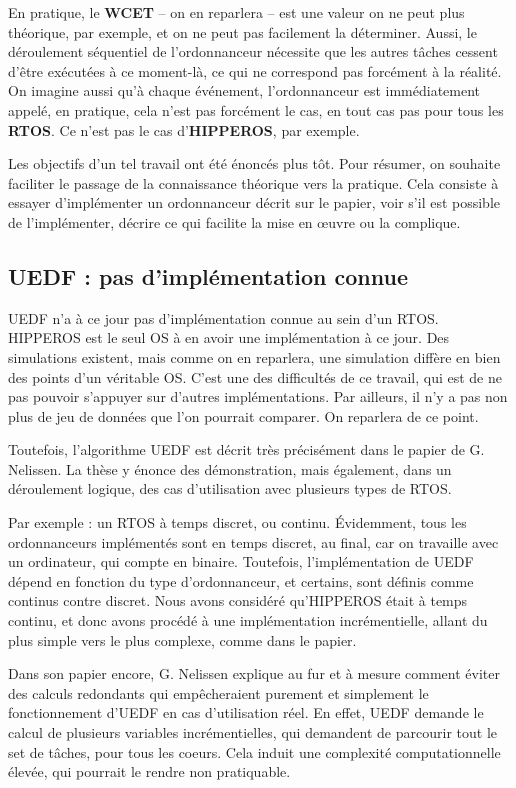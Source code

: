 	En pratique, le \textbf{WCET} -- on en reparlera -- est une valeur on ne peut plus théorique, par exemple, 
	et on ne peut pas facilement la déterminer. 
	Aussi, le déroulement séquentiel de l'ordonnanceur nécessite que les autres tâches cessent d'être exécutées 
	à ce moment-là, ce qui ne correspond pas forcément à la réalité.
	On imagine aussi qu'à chaque événement, l'ordonnanceur est immédiatement appelé, 
	en pratique, cela n'est pas forcément le cas, en tout cas pas pour tous les 
	\textbf{RTOS}. Ce n'est pas le cas d'\textbf{HIPPEROS}, par exemple.

	Les objectifs d'un tel travail ont été énoncés plus tôt. 
	Pour résumer, on souhaite faciliter le passage de la connaissance théorique vers la pratique.
	Cela consiste à essayer d'implémenter un ordonnanceur décrit sur le papier, voir s'il est 
	possible de l'implémenter, décrire ce qui facilite la mise en œuvre ou la complique. 
	
	
	\subsection{UEDF : pas d'implémentation connue}
	UEDF n'a à ce jour pas d'implémentation connue au sein d'un RTOS. HIPPEROS est le seul OS à en 
	avoir une implémentation à ce jour. Des simulations existent, mais comme on en reparlera, une simulation diffère 
	en bien des points d'un véritable OS. C'est une des difficultés de ce travail, qui est de ne pas pouvoir 
	s'appuyer sur d'autres implémentations. Par ailleurs, il n'y a pas non plus de jeu de données que l'on 
	pourrait comparer. On reparlera de ce point. 
	
	Toutefois, l'algorithme UEDF est décrit très précisément dans le papier de G. Nelissen. La thèse y énonce 
	des démonstration, mais également, dans un déroulement logique, des cas d'utilisation avec 
	plusieurs types de RTOS. 
	
	Par exemple : un RTOS à temps discret, ou continu. 
	Évidemment, tous les ordonnanceurs implémentés sont en temps discret, au final, car on travaille avec 
	un ordinateur, qui compte en binaire. Toutefois, l'implémentation de UEDF dépend en fonction du type 
	d'ordonnanceur, et certains,  sont définis comme continus 
	contre discret. Nous avons considéré qu'HIPPEROS était à temps continu, et donc avons procédé à une implémentation incrémentielle, allant du plus simple vers le plus complexe, comme dans le papier.
	
	
	Dans son papier encore, G. Nelissen explique au fur et à mesure comment éviter des calculs 
	redondants qui empêcheraient purement et simplement le fonctionnement d'UEDF en cas d'utilisation réel.
	 En effet, UEDF demande le calcul de plusieurs variables incrémentielles, 
	qui demandent de parcourir tout le set de tâches, pour tous les coeurs. Cela induit une complexité computationnelle 
	élevée, qui pourrait le rendre non pratiquable.
	
